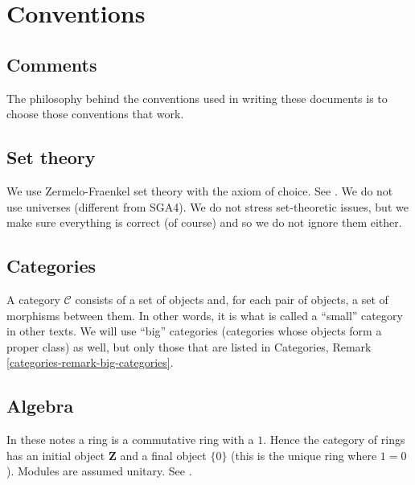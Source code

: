 \documentclass{stacks-project-book}
\theoremstyle{plain}
\theoremstyle{definition}
\theoremstyle{remark}
\numberwithin{equation}{subsection}
\begin{document}
%

\chapter{Conventions}



\label{conventions-section-phantom}


\section{Comments}
\label{conventions-section-comments}

\noindent
The philosophy behind the conventions used in writing these documents is
to choose those conventions that work.

\section{Set theory}
\label{conventions-section-sets}

\noindent
We use Zermelo-Fraenkel set theory with the axiom of choice.
See \cite{Kunen}. We do not use
universes (different from SGA4). We do not stress set-theoretic issues,
but we make sure everything is correct (of course) and so we do not ignore
them either.


\section{Categories}
\label{conventions-section-categories}

\noindent
A category $\mathcal{C}$ consists of a set of objects and, for each pair
of objects,
a set of morphisms between them. In other words, it is what is called
a ``small'' category in other texts. We will use ``big'' categories
(categories whose objects form a proper class)
as well, but only those that are listed in Categories,
Remark \ref{categories-remark-big-categories}.

\section{Algebra}
\label{conventions-section-algebra}

\noindent
In these notes a ring is a commutative ring with a $1$. Hence the
category of rings has an initial object $\mathbf{Z}$ and a final
object $\{0\}$ (this is the unique ring where $1 = 0$). Modules are
assumed unitary. See \cite{Eisenbud}.
\end{document}
